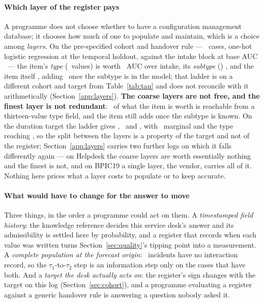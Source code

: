 \paragraph{Which layer of the register pays}
A programme does not choose whether to have a configuration management
database; it chooses how much of one to populate and maintain, which is a
choice among \emph{layers}. On the pre-specified cohort and handover rule ---
\layerLadderN\ cases, one-hot logistic regression at the temporal holdout,
against the intake block at base AUC \layerBaseHandover\ --- the item's
\emph{type} (\nLayerTypeLevels\ values) is worth \layerTypeHandover\ AUC over
intake, its \emph{subtype} (\nLayerSubtypeLevels) \layerSubtypeHandover, and
the item itself \layerItemHandover, adding \layerItemMarginalHandover\ once
the subtype is in the model; that ladder is on a different cohort and target
from Table~\ref{tab:tau} and does not reconcile with it arithmetically
(Section~\ref{app:layers}). \textbf{The coarse layers are not free, and
the finest layer is not redundant}: \layerTypeSharePctHandover\ of what the
item is worth is reachable from a thirteen-value type field, and the item
still adds once the subtype is known. On the duration target the ladder
gives \layerTypeDuration, \layerSubtypeDuration\ and \layerItemDuration, with
\layerItemMarginalDuration\ marginal and the type reaching
\layerTypeSharePctDuration, so the split between the layers is a property of
the target and not of the register; Section~\ref{app:layers} carries two
further logs on which it falls differently again --- on Helpdesk the coarse
layers are worth essentially nothing and the finest is not, and on BPIC19 a
single layer, the vendor, carries all of it. Nothing here prices what a layer costs to populate or
to keep accurate.

\paragraph{What would have to change for the answer to move}
Three things, in the order a programme could act on them. A
\emph{timestamped field history}: the knowledge reference decides this
service desk's answer and its admissibility is settled here by probability, and a
register that records when each value was written turns
Section~\ref{sec:quality}'s tipping point into a measurement. A
\emph{complete population at the forecast origin}: \nTauTwoUnmatched\ incidents
have no interaction record, so the $\tau_1$-to-$\tau_2$ step is an
information step only on the cases that have both. And a \emph{target the
desk actually acts on}: the register's sign changes with the target on this
log (Section~\ref{sec:cohort}), and a programme evaluating a register against
a generic handover rule is answering a question nobody asked it.

